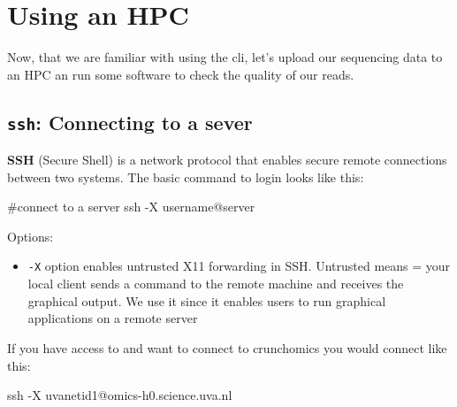 \documentclass[
  letterpaper,
  DIV=11,
  numbers=noendperiod]{scrreprt}
\author{}
\date{}
\newenvironment{Shaded}{}{}
\newcommand{\AttributeTok}[1]{\textcolor[rgb]{0.84,0.23,0.29}{#1}}
\newcommand{\CommentTok}[1]{\textcolor[rgb]{0.42,0.45,0.49}{#1}}
\newcommand{\FunctionTok}[1]{\textcolor[rgb]{0.44,0.26,0.76}{#1}}
\newcommand{\NormalTok}[1]{\textcolor[rgb]{0.14,0.16,0.18}{#1}}
\providecommand{\tightlist}{%
  \setlength{\itemsep}{0pt}\setlength{\parskip}{0pt}}\usepackage{longtable,booktabs,array}
\renewcommand*\contentsname{Table of contents}
\newcommand\contentsname{Table of contents}
\begin{document}

\renewcommand*\contentsname{Table of contents}
{
\hypersetup{linkcolor=}
\setcounter{tocdepth}{2}
\tableofcontents
}
\chapter{Using an HPC}\label{using-an-hpc}

Now, that we are familiar with using the cli, let's upload our
sequencing data to an HPC an run some software to check the quality of
our reads.

\section{\texorpdfstring{\texttt{ssh}: Connecting to a
sever}{ssh: Connecting to a sever}}\label{ssh-connecting-to-a-sever}

\textbf{SSH} (Secure Shell) is a network protocol that enables secure
remote connections between two systems. The basic command to login looks
like this:

\begin{Shaded}
\begin{Highlighting}[]
\CommentTok{\#connect to a server}
\FunctionTok{ssh} \AttributeTok{{-}X}\NormalTok{ username@server}
\end{Highlighting}
\end{Shaded}

Options:

\begin{itemize}
\tightlist
\item
  \texttt{-X} option enables untrusted X11 forwarding in SSH. Untrusted
  means = your local client sends a command to the remote machine and
  receives the graphical output. We use it since it enables users to run
  graphical applications on a remote server
\end{itemize}

If you have access to and want to connect to crunchomics you would
connect like this:

\begin{Shaded}
\begin{Highlighting}[]
\FunctionTok{ssh} \AttributeTok{{-}X}\NormalTok{ uvanetid1@omics{-}h0.science.uva.nl}
\end{Highlighting}
\end{Shaded}
\end{document}
